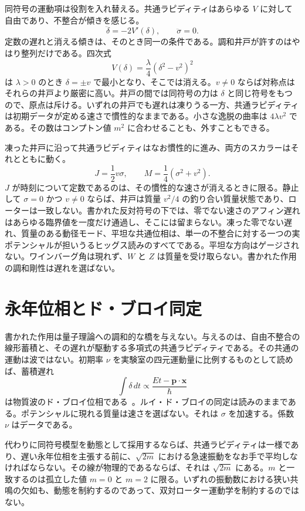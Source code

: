 \documentclass[a4paper]{article}
\begin{document}
同符号の運動項は役割を入れ替える。共通ラピディティはあらゆる \(V\) に対して自由であり、不整合が傾きを感じる。
\[
\ddot\delta=-2V'(\delta),\qquad\ddot\sigma=0.
\]
定数の遅れと消える傾きは、そのとき同一の条件である。調和井戸が許すのはやはり整列だけである。四次式
\[
V(\delta)=\frac\lambda4(\delta^2-v^2)^2
\]
は \(\lambda>0\) のとき \(\delta=\pm v\) で最小となり、そこでは消える。\(v\neq 0\) ならば対称点はそれらの井戸より厳密に高い。井戸の間では同符号の力は \(\delta\) と同じ符号をもつので、原点は斥ける。いずれの井戸でも遅れは凍りうる一方、共通ラピディティは初期データが定める速さで慣性的なままである。小さな逸脱の曲率は \(4\lambda v^2\) である。その数はコンプトン値 \(m^2\) に合わせることも、外すこともできる。

凍った井戸に沿って共通ラピディティはなお慣性的に進み、両方のスカラーはそれとともに動く。
\[
J=\frac12 v\sigma,\qquad M=\frac14(\sigma^2+v^2).
\]
\(J\) が時刻について定数であるのは、その慣性的な速さが消えるときに限る。静止して \(\sigma=0\) かつ \(v\neq 0\) ならば、井戸は質量 \(v^2/4\) の釣り合い質量状態であり、ローターは一致しない。書かれた反対符号の下では、零でない速さのアフィン遅れはあらゆる臨界値を一度だけ通過し、そこには留まらない。凍った零でない遅れ、質量のある動径モード、平坦な共通位相は、単一の不整合に対する一つの実ポテンシャルが担いうるヒッグス読みのすべてである。平坦な方向はゲージされない。ワインバーグ角は現れず、\(W\) と \(Z\) は質量を受け取らない。書かれた作用の調和剛性は遅れを選ばない。

\section{永年位相とド・ブロイ同定}

書かれた作用は量子理論への調和的な橋を与えない。与えるのは、自由不整合の線形蓄積と、その遅れが駆動する多項式の共通ラピディティである。その共通の運動は波ではない。初期率 \(\nu\) を実験室の四元運動量に比例するものとして読めば、蓄積遅れ
\[
\int\delta\,dt
  \propto\frac{Et-\mathbf{p}\cdot\mathbf{x}}{\hbar}
\]
は物質波のド・ブロイ位相である~\cite{debroglie1924}。ルイ・ド・ブロイの同定は読みのままである。ポテンシャルに現れる質量は速さを選ばない。それは \(\sigma\) を加速する。係数 \(\nu\) はデータである。

代わりに同符号模型を動態として採用するならば、共通ラピディティは一様であり、遅い永年位相を主張する前に、\(\sqrt{2m}\) における急速振動をなお手で平均しなければならない。その線が物理的であるならば、それは \(\sqrt{2m}\) にある。\(m\) と一致するのは孤立した値 \(m=0\) と \(m=2\) に限る。いずれの振動数における狭い共鳴の欠如も、動態を制約するのであって、双対ローター運動学を制約するのではない。
\end{document}

